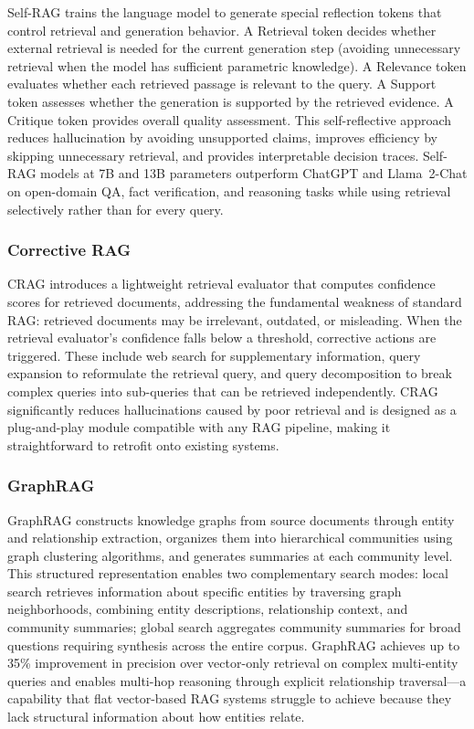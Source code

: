 \documentclass[11pt,letterpaper]{article}
\begin{document}
Self-RAG \cite{asai2024selfrag} trains the language model to generate special reflection tokens that control retrieval and generation behavior. A Retrieval token decides whether external retrieval is needed for the current generation step (avoiding unnecessary retrieval when the model has sufficient parametric knowledge). A Relevance token evaluates whether each retrieved passage is relevant to the query. A Support token assesses whether the generation is supported by the retrieved evidence. A Critique token provides overall quality assessment. This self-reflective approach reduces hallucination by avoiding unsupported claims, improves efficiency by skipping unnecessary retrieval, and provides interpretable decision traces. Self-RAG models at 7B and 13B parameters outperform ChatGPT and Llama~2-Chat on open-domain QA, fact verification, and reasoning tasks while using retrieval selectively rather than for every query.

\subsubsection{Corrective RAG}

CRAG \cite{yan2024corrective} introduces a lightweight retrieval evaluator that computes confidence scores for retrieved documents, addressing the fundamental weakness of standard RAG: retrieved documents may be irrelevant, outdated, or misleading. When the retrieval evaluator's confidence falls below a threshold, corrective actions are triggered. These include web search for supplementary information, query expansion to reformulate the retrieval query, and query decomposition to break complex queries into sub-queries that can be retrieved independently. CRAG significantly reduces hallucinations caused by poor retrieval and is designed as a plug-and-play module compatible with any RAG pipeline, making it straightforward to retrofit onto existing systems.

\subsubsection{GraphRAG}

GraphRAG constructs knowledge graphs from source documents through entity and relationship extraction, organizes them into hierarchical communities using graph clustering algorithms, and generates summaries at each community level. This structured representation enables two complementary search modes: local search retrieves information about specific entities by traversing graph neighborhoods, combining entity descriptions, relationship context, and community summaries; global search aggregates community summaries for broad questions requiring synthesis across the entire corpus. GraphRAG achieves up to 35\% improvement in precision over vector-only retrieval on complex multi-entity queries and enables multi-hop reasoning through explicit relationship traversal---a capability that flat vector-based RAG systems struggle to achieve because they lack structural information about how entities relate.
\end{document}
